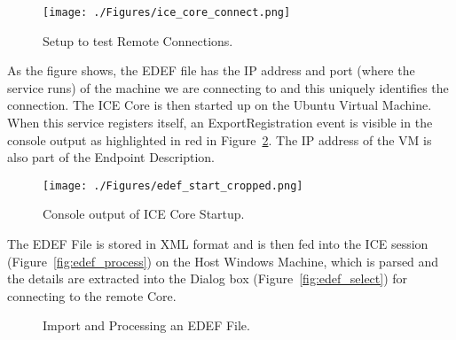 \begin{figure}[thb]
\begin{center}
\leavevmode
\texttt{[image: ./Figures/ice\_core\_connect.png]}
\end{center}
\caption{Setup to test Remote Connections.}
\label{fig:test_remote_connections}
\end{figure}

As the figure shows, the EDEF file has the IP address and port (where the 
service runs) of the machine we are connecting to and this uniquely identifies 
the connection. The ICE Core is then started up on the Ubuntu Virtual Machine. 
When this service registers itself, an ExportRegistration event is visible in 
the console output as highlighted in red in Figure~\ref{fig:ice_core_startup}. 
The IP address of the VM is also part of the Endpoint Description.

\begin{figure}[thb]
\begin{center}
\leavevmode
\texttt{[image: ./Figures/edef\_start\_cropped.png]}
\end{center}
\caption{Console output of ICE Core Startup.}
\label{fig:ice_core_startup}
\end{figure}

The EDEF File is stored in XML format and is then fed into the ICE session 
(Figure~\ref{fig:edef_process}) on the Host Windows Machine, which is parsed 
and the details are extracted into the Dialog box 
(Figure~\ref{fig:edef_select}) for connecting to the remote Core.


\begin{figure}[thb]
  \centering
  \hspace{1em}%
  \caption{Import and Processing an EDEF File.}
\end{figure}

